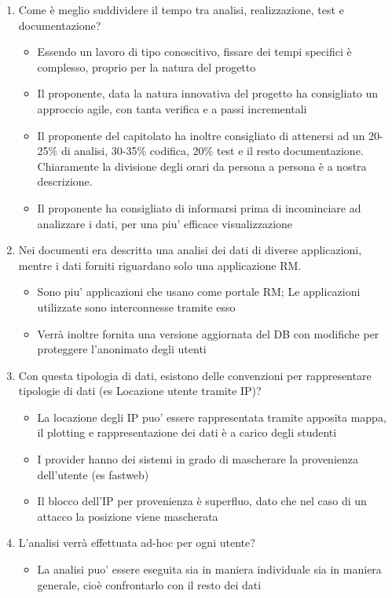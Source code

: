 \begin{enumerate}
	\item Come è meglio suddividere il tempo tra analisi, realizzazione, test e documentazione?
	\begin{itemize}
		\item Essendo un lavoro di tipo conoscitivo, fissare dei tempi specifici è complesso, proprio per la natura del progetto
		\item Il proponente, data la natura innovativa del progetto ha consigliato un approccio agile, con tanta verifica e a passi incrementali
		\item Il proponente del capitolato ha inoltre consigliato di attenersi ad un 20-25\% di analisi, 30-35\% codifica, 20\% test e il resto documentazione. Chiaramente la divisione degli orari da persona a persona è a nostra descrizione.
		\item Il proponente ha consigliato di informarsi prima di incominciare ad analizzare i dati, per una piu' efficace visualizzazione
	\end{itemize}

	\item Nei documenti era descritta una analisi dei dati di diverse applicazioni, mentre i dati forniti riguardano solo una applicazione RM.
	\begin{itemize}
		\item Sono piu' applicazioni che usano come portale RM; Le applicazioni utilizzate sono interconnesse tramite esso
		\item Verrà inoltre fornita una versione aggiornata del DB con modifiche per proteggere l'anonimato degli utenti
	\end{itemize}

	\item Con questa tipologia di dati, esistono delle convenzioni per rappresentare tipologie di dati (es Locazione utente tramite IP)?
	\begin{itemize}
		\item La locazione degli IP puo' essere rappresentata tramite apposita mappa, il plotting e rappresentazione dei dati è a carico degli studenti
		\item I provider hanno dei sistemi in grado di mascherare la provenienza dell'utente (es fastweb)
		\item Il blocco dell'IP per provenienza è superfluo, dato che nel caso di un attacco la posizione viene mascherata
	\end{itemize}

	\item L'analisi verrà effettuata ad-hoc per ogni utente?
	\begin{itemize}
		\item La analisi puo' essere eseguita sia in maniera individuale sia in maniera generale, cioè confrontarlo con il resto dei dati
	\end{itemize}
\end{enumerate}

